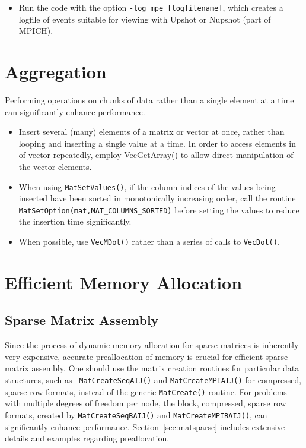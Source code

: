 {\begin{itemize}
\item Run the code with the option {\tt -log\_mpe [logfilename]}, which creates a
   logfile of events suitable for viewing with Upshot or Nupshot (part of
   MPICH). 

\end{itemize}

\section{Aggregation}

Performing operations on chunks of data rather than a single element
at a time can significantly enhance performance.  
\begin{itemize}
\item Insert several (many) elements of a matrix or vector at once, rather 
   than looping and inserting a single value at a time.  In order to
   access elements in of vector repeatedly, employ {VecGetArray()} to allow 
   direct manipulation of the vector elements. 

\item When using {\tt MatSetValues()}, if the column indices of the values being
   inserted have been sorted in monotonically increasing order, call
   the routine {\tt MatSetOption(mat,MAT\_COLUMNS\_SORTED)} before setting the values
   to reduce the insertion time significantly.

\item When possible, use {\tt VecMDot()} rather than a series of calls to {\tt VecDot()}.
\end{itemize}

\section{Efficient Memory Allocation}
\label{sec:perf:memory}

\subsection{Sparse Matrix Assembly}

Since the process of dynamic memory allocation for sparse matrices is
inherently very expensive, accurate preallocation of memory is crucial
for efficient sparse matrix assembly.  One should use the matrix creation
routines for particular data structures, such as {\tt
MatCreateSeqAIJ()} and {\tt MatCreateMPIAIJ()} for compressed, sparse
row formats, instead of the generic {\tt MatCreate()} routine.  For
problems with multiple degrees of freedom per node, the block,
compressed, sparse row formats, created by {\tt MatCreateSeqBAIJ()}
and {\tt MatCreateMPIBAIJ()}, can significantly enhance performance.
Section~\ref{sec:matsparse} includes extensive details and
examples regarding preallocation.

}
